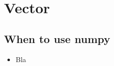 \documentclass[12pt,a4paper]{article}
\begin{document}
\section{Vector}
\subsection{When to use numpy}
\begin{itemize}
\item Bla
\end{itemize}
\end{document}

